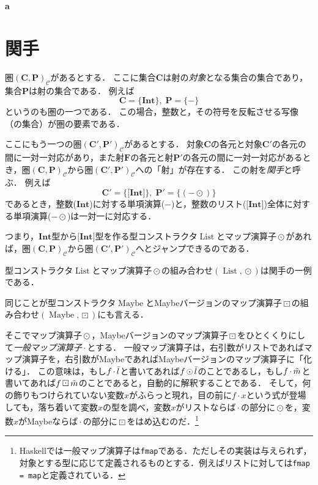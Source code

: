 \documentclass[twocolumn]{jsbook}
\newcommand{\keyword}[1]{\emph{#1}}
\newcommand{\code}[1]{\texttt{#1}}
\newenvironment{leader}{\begingroup\bf}{\endgroup}
\newcommand{\hsklType}[1]{\textbf{#1}}
\newcommand{\hsklTypeConstructor}[1]{\mathop{\mathrm{#1}}}
\DeclareMathOperator{\hsklFmap}{\cdot}
\DeclareMathOperator{\hsklListConstructor}{\hsklTypeConstructor{List}}
\DeclareMathOperator{\hsklMap}{\odot}
\DeclareMathOperator{\hsklMaybeConstructor}{\hsklTypeConstructor{Maybe}}
\DeclareMathOperator{\hsklMaybeMap}{\boxdot}
\newcommand{\hsklInt}{\hsklType{Int}}
\newcommand{\hsklList}[1]{\Bar{#1}}
\newcommand{\hsklListType}[1]{\boldsymbol{[}#1\boldsymbol{]}}
\newcommand{\hsklMaybe}[1]{\Tilde{#1}}
\newcommand{\mathSet}[1]{\mathbf{#1}}
\newcommand{\mathCategoryShort}[2]{(#1,#2)_\mathcal{C}}
\begin{document}
\begin{leader}
a
\end{leader}


\section{関手}

圏$\mathCategoryShort{\mathSet{C}}{\mathSet{P}}$があるとする．
ここに集合$\mathSet{C}$は射の\keyword{対象}となる集合の集合であり，集合$\mathSet{P}$は射の集合である．
例えば$$\mathSet{C}=\{\hsklInt\},\;\mathSet{P}=\{-\}$$というのも圏の一つである．
この場合，整数と，その符号を反転させる写像（の集合）が圏の要素である．

ここにもう一つの圏$\mathCategoryShort{\mathSet{C}'}{\mathSet{P}'}$があるとする．
対象$\mathSet{C}$の各元と対象$\mathSet{C}'$の各元の間に一対一対応があり，また射$\mathSet{F}$の各元と射$\mathSet{P}'$の各元の間に一対一対応があるとき，圏$\mathCategoryShort{\mathSet{C}}{\mathSet{P}}$から圏$\mathCategoryShort{\mathSet{C}'}{\mathSet{P}'}$への「射」が存在する．
この射を\keyword{関手}と呼ぶ．
例えば$$\mathSet{C}'=\{\hsklListType{\hsklInt}\},\;\mathSet{P}'=\{(-\hsklMap)\}$$であるとき，整数($\hsklInt$)に対する単項演算($-$)と，整数のリスト($\hsklListType{\hsklInt}$)全体に対する単項演算($-\hsklMap$)は一対一に対応する．

つまり，$\hsklInt$型から$\hsklListType{\hsklInt}$型を作る型コンストラクタ$\hsklListConstructor$とマップ演算子$\hsklMap$があれば，圏$\mathCategoryShort{\mathSet{C}}{\mathSet{P}}$から圏$\mathCategoryShort{\mathSet{C}'}{\mathSet{P}'}$へとジャンプできるのである．

型コンストラクタ$\hsklListConstructor$とマップ演算子$\hsklMap$の組み合わせ$(\hsklListConstructor,\hsklMap)$は関手の一例である．

同じことが型コンストラクタ$\hsklMaybeConstructor$とMaybeバージョンのマップ演算子$\hsklMaybeMap$の組み合わせ$(\hsklMaybeConstructor,\hsklMaybeMap)$にも言える．

そこでマップ演算子$\hsklMap$，Maybeバージョンのマップ演算子$\hsklMaybeMap$をひとくくりにして\keyword{一般マップ演算子}$\hsklFmap$とする．
一般マップ演算子は，右引数がリストであればマップ演算子を，右引数がMaybeであればMaybeバージョンのマップ演算子に「化ける」．
この意味は，もし$f\hsklFmap\hsklList{l}$と書いてあれば$f\hsklMap\hsklList{l}$のことであるし，もし$f\hsklFmap\hsklMaybe{m}$と書いてあれば$f\hsklMaybeMap\hsklMaybe{m}$のことであると，自動的に解釈することである．
そして，何の飾りもつけられていない変数$x$がふらっと現れ，目の前に$f\hsklFmap x$という式が登場しても，落ち着いて変数$x$の型を調べ，変数$x$がリストならば$\hsklFmap$の部分に$\hsklMap$を，変数$x$がMaybeならば$\hsklFmap$の部分に$\hsklMaybeMap$をはめ込むのだ．\footnote{Haskellでは一般マップ演算子は\code{fmap}である．ただしその実装は与えられず，対象とする型に応じて定義されるものとする．例えばリストに対しては\code{fmap = map}と定義されている．}
\end{document}
